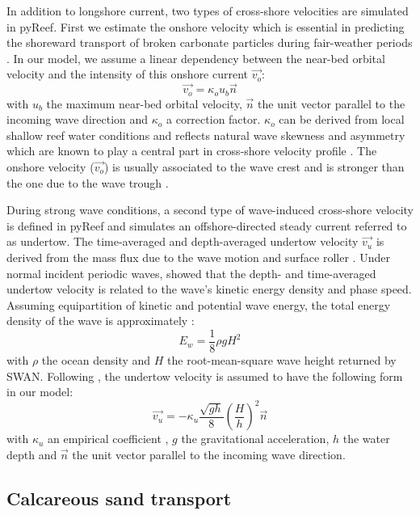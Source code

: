 \documentclass[default,jgrga]{agutex2015}
\begin{document}
\begin{article}
In addition to longshore current, two types of cross-shore velocities are simulated in pyReef. First we estimate the onshore velocity which is essential in predicting the shoreward transport of broken carbonate particles during fair-weather periods  \citep{Elfrink99, Ruessink98}. In our model, we assume a linear dependency between the near-bed orbital velocity and the intensity of this onshore current $\vec{v_o}$:
\begin{equation}
\vec{v_o} = \kappa_o u_b \vec{n}
\end{equation}
with $u_b$ the maximum near-bed orbital velocity, $\vec{n}$ the unit vector parallel to the incoming wave direction and $\kappa_o$ a correction factor. $\kappa_o$ can be derived from local shallow reef water conditions and reflects natural wave skewness and asymmetry which are known to play a central part in cross-shore velocity profile \citep{Grasmeijer03, Crawford03}. The onshore velocity ($\vec{v_o}$) is usually associated to the wave crest and is stronger than the one due to the wave trough \citep{Isobe82, Grasmeijer03}.

During strong wave conditions, a second type of wave-induced cross-shore velocity is defined in pyReef and simulates an offshore-directed steady current referred to as undertow. The time-averaged and depth-averaged undertow velocity $\vec{v_u}$ is derived from the mass flux due to the wave motion and surface roller \citep{Svendsen87}. Under normal incident periodic waves, \citet{Longuet-Higgins75} showed that the depth- and time-averaged undertow velocity is related to the wave's kinetic energy density and phase speed. Assuming  equipartition of kinetic and potential wave energy, the total energy density of the wave is approximately \citep{Svendsen84}:
\begin{equation}
E_w = \frac{1}{8} \rho g H^2
\end{equation}
with $\rho$ the ocean density and  $H$ the root-mean-square wave height returned by SWAN. Following \citet{Cox98}, the undertow velocity is assumed to have the following form in our model:
\begin{equation}
\vec{v_u} = - \kappa_u \frac{\sqrt{g h}}{8} \left(\frac{H}{h} \right)^2 \vec{n}
\end{equation}
with $\kappa_u$ an empirical coefficient \citep{Kobayashi98}, $g$ the gravitational acceleration, $h$ the water depth and $\vec{n}$ the unit vector parallel to the incoming wave direction.

\subsection{Calcareous sand transport}


\end{article}
\end{document}
